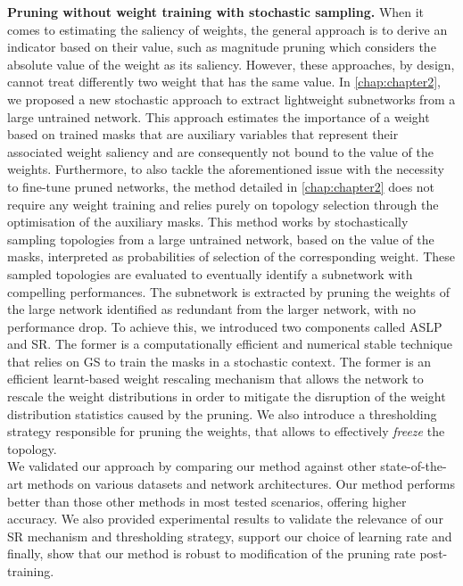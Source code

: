 \noindent \textbf{Pruning without weight training with stochastic sampling.}
When it comes to estimating the saliency of weights, the general approach is to
derive an indicator based on their value, such as magnitude pruning which
considers the absolute value of the weight as its saliency. However, these
approaches, by design, cannot treat differently two weight that has the same
value. In \cref{chap:chapter2}, we proposed a new stochastic approach to extract
lightweight subnetworks from a large untrained network. This approach estimates
the importance of a weight based on trained masks that are auxiliary variables
that represent their associated weight saliency and are consequently not bound
to the value of the weights. Furthermore, to also tackle the aforementioned
issue with the necessity to fine-tune pruned networks, the method detailed in
\cref{chap:chapter2} does not require any weight training and relies purely on
topology selection through the optimisation of the auxiliary masks. This method
works by stochastically sampling topologies from a large untrained network,
based on the value of the masks, interpreted as probabilities of selection of
the corresponding weight. These sampled topologies are evaluated to eventually
identify a subnetwork with compelling performances. The subnetwork is extracted
by pruning the weights of the large network identified as redundant from the
larger network, with no performance drop. To achieve this, we introduced two
components called \acf{ASLP} and \acf{SR}. The former is a computationally
efficient and numerical stable technique that relies on \acl{GS} to train the
masks in a stochastic context. The former is an efficient learnt-based weight
rescaling mechanism that allows the network to rescale the weight distributions
in order to mitigate the disruption of the weight distribution statistics caused
by the pruning. We also introduce a thresholding strategy responsible for
pruning the weights, that allows to effectively \emph{freeze} the topology.\\

We validated our approach by comparing our method against other state-of-the-art
methods on various datasets and network architectures. Our method performs
better than those other methods in most tested scenarios, offering higher
accuracy. We also provided experimental results to validate the relevance of our
\ac{SR} mechanism and thresholding strategy, support our choice of learning rate
and finally, show that our method is robust to modification of the pruning rate
post-training.\\ 

